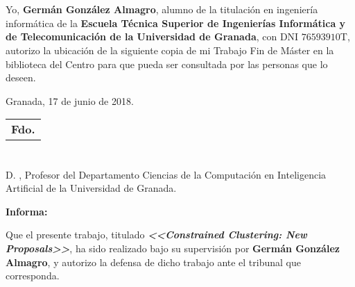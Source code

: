 \chapter*{}
\thispagestyle{empty}


Yo, \textbf{Germán González Almagro}, alumno de la titulación en ingeniería informática de la \textbf{Escuela Técnica Superior
de Ingenierías Informática y de Telecomunicación de la Universidad de Granada}, con DNI $\mathrm{76593910}$T, autorizo la
ubicación de la siguiente copia de mi Trabajo Fin de Máster en la biblioteca del Centro para que pueda ser
consultada por las personas que lo deseen.

\vspace{0.1cm}

\begin{flushleft}
	Granada, 17 de junio de 2018.
\end{flushleft}

\vspace{2.5cm}

\begin{flushright}
	
	\begin{tabular}{m{6cm}}
		\\ \hline
		\centering\textbf{Fdo. \myName} \\
	\end{tabular}
	
\end{flushright}


\chapter*{}
\thispagestyle{empty}


D. \textbf{\myProf}, Profesor del Departamento Ciencias de la Computación en Inteligencia Artificial de la Universidad de Granada.

\vspace{0.5cm}

\textbf{Informa:}

\vspace{0.5cm}

Que el presente trabajo, titulado \textit{\textbf{<<Constrained Clustering: New Proposals>>}},
ha sido realizado bajo su supervisión por \textbf{Germán González Almagro}, y autorizo la defensa de dicho trabajo ante el tribunal
que corresponda.

